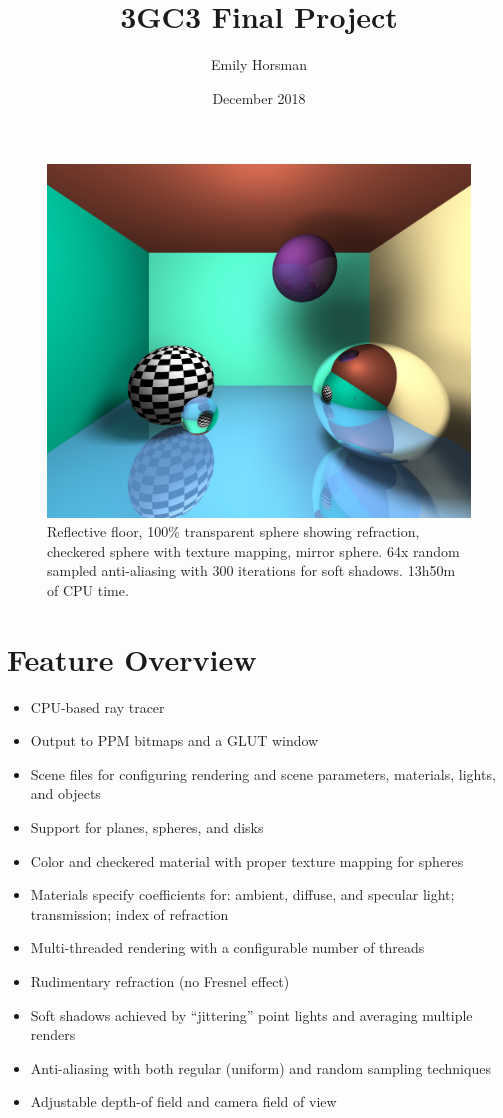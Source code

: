 \documentclass{article}
\title{3GC3 Final Project}
\author{Emily Horsman}
\date{December 2018}
\begin{document}
\maketitle

\begin{figure}[H]
    \includegraphics[width=\textwidth]{./examples/SphereRoom.png}
    \caption{Reflective floor, 100\% transparent sphere showing refraction, checkered sphere with texture mapping, mirror sphere. 64x random sampled anti-aliasing with 300 iterations for soft shadows. 13h50m of CPU time.}
\end{figure}

\newpage
\tableofcontents

\section{Feature Overview}

\begin{itemize}
    \item CPU-based ray tracer
    \item Output to PPM bitmaps and a GLUT window
    \item Scene files for configuring rendering and scene parameters, materials, lights, and objects
    \item Support for planes, spheres, and disks
    \item Color and checkered material with proper texture mapping for spheres
    \item Materials specify coefficients for: ambient, diffuse, and specular light; transmission; index of refraction
    \item Multi-threaded rendering with a configurable number of threads
    \item Rudimentary refraction (no Fresnel effect)
    \item Soft shadows achieved by ``jittering'' point lights and averaging multiple renders
    \item Anti-aliasing with both regular (uniform) and random sampling techniques
    \item Adjustable depth-of field and camera field of view
\end{itemize}
\end{document}
